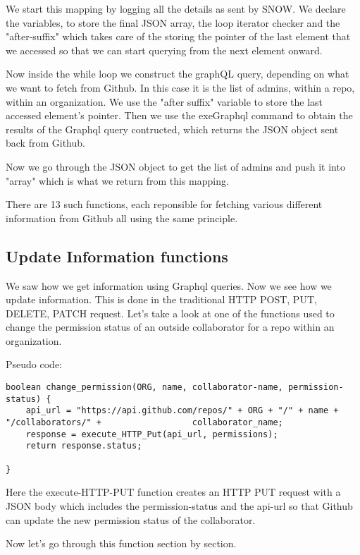 We start this mapping by logging all the details as sent by SNOW. We declare the variables, to store the final JSON array, the loop iterator checker and the "after-suffix" which takes care of the storing the pointer of the last element that we accessed so that we can start querying from the next element onward.


Now inside the while loop we construct the graphQL query, depending on what we want to fetch from Github. In this case it is the list of admins, within a repo, within an organization. We use the "after suffix" variable to store the last accessed element's pointer. Then we use the exeGraphql command to obtain the results of the Graphql query contructed, which returns the JSON object sent back from Github.


Now we go through the JSON object to get the list of admins and push it into "array" which is what we return from this mapping.

There are 13 such functions, each reponsible for fetching various different information from Github all using the same principle.

\subsection{Update Information functions}
We saw how we get information using Graphql queries. Now we see how we update information. This is done in the traditional HTTP POST, PUT, DELETE, PATCH request. Let's take a look at one of the functions used to change the permission status of an outside collaborator for a repo within an organization.

Pseudo code:

\begin{lstlisting}[breaklines]
boolean change_permission(ORG, name, collaborator-name, permission-status) {
	api_url = "https://api.github.com/repos/" + ORG + "/" + name + "/collaborators/" + 					collaborator_name;
	response = execute_HTTP_Put(api_url, permissions);
	return response.status;
	
}
\end{lstlisting}

Here the execute-HTTP-PUT function creates an HTTP PUT request with a JSON body which includes the permission-status and the api-url so that Github can update the new permission status of the collaborator.

Now let's go through this function section by section.

